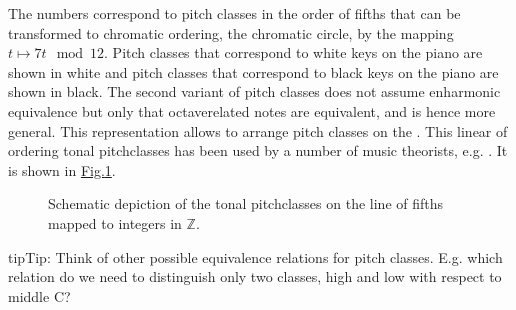 \documentclass[letterpaper,10pt,english]{sphinxmanual}
\begin{document}
The numbers correspond to pitch classes in the order of fifths that can be transformed to chromatic ordering, the
chromatic circle, by the mapping \(t \mapsto 7 t \mod 12\). Pitch classes that correspond to white
keys on the piano are shown in white and pitch classes that correspond to black keys on the
piano are shown in black. The second variant of pitch classes does not assume enharmonic
equivalence but only that octave\sphinxhyphen{}related notes are equivalent, and is hence more general.
This representation allows to arrange pitch classes on the  .
This linear of ordering tonal pitch\sphinxhyphen{}classes has been used by a number of music theorists, e.g.
. It is shown in \hyperref[\detokenize{tonality:line-of-fifths}]{Fig.\@ \ref{\detokenize{tonality:line-of-fifths}}}.

\begin{figure}[htbp]
\centering
\capstart

\noindent{}
\caption{Schematic depiction of the tonal pitch\sphinxhyphen{}classes on the line of fifths mapped to integers in \(\mathbb{Z}\).}\label{\detokenize{tonality:id17}}\label{\detokenize{tonality:line-of-fifths}}\end{figure}

\begin{sphinxadmonition}{tip}{Tip:}
Think of other possible equivalence relations for pitch classes.
E.g. which relation do we need to distinguish only two classes, high and low with respect to middle C?
\end{sphinxadmonition}
\end{document}
